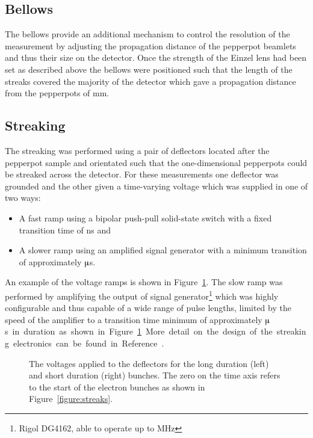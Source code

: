 \subsection{Bellows}

The bellows provide an additional mechanism to control the resolution of the measurement by adjusting the propagation distance of the pepperpot beamlets and thus their size on the detector.
Once the strength of the Einzel lens had been set as described above the bellows were positioned such that the length of the streaks covered the majority of the detector which gave a propagation distance from the pepperpots of \unit[475]{mm}.

\subsection{Streaking}
The streaking was performed using a pair of deflectors located after the pepperpot sample and orientated such that the one-dimensional pepperpots could be streaked across the detector.
For these measurements one deflector was grounded and the other given a time-varying voltage which was supplied in one of two ways:
\begin{itemize}
\item A fast ramp using a bipolar push-pull solid-state switch with a fixed transition time of \unit[10]{ns} and
\item A slower ramp using an amplified signal generator with a minimum transition of approximately \unit[10]{$\muup$s}.
\end{itemize}
An example of the voltage ramps is shown in Figure~\ref{figure:deflector_voltages}. The slow ramp was performed by amplifying the output of signal generator\footnote{Rigol DG4162, able to operate up to \unit[160]{MHz}} which was highly configurable and thus capable of a wide range of pulse lengths, limited by the speed of the amplifier to a transition time minimum of approximately \unit[10]{$\muup$s} in duration as shown in Figure~\ref{figure:deflector_voltages}.
More detail on the design of the streaking electronics can be found in Reference~\cite{speirs_electron_2017}.

\begin{figure}
    \center
    
    \caption[Streak deflector voltages.]{The voltages applied to the deflectors for the long duration (left) and short duration (right) bunches. The zero on the time axis refers to the start of the electron bunches as shown in Figure~\ref{figure:streaks}.}
    \label{figure:deflector_voltages}
\end{figure}


